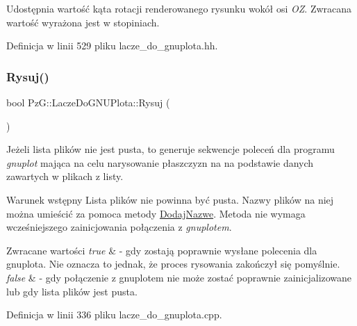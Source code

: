 Udostępnia wartość kąta rotacji renderowanego rysunku wokół osi {\itshape OZ}. Zwracana wartość wyrażona jest w stopiniach. 

Definicja w linii 529 pliku lacze\+\_\+do\+\_\+gnuplota.\+hh.

\mbox{\label{class_pz_g_1_1_lacze_do_g_n_u_plota_a065f5b8402737cc62b0ad4f66d028335}} 
\subsubsection{\texorpdfstring{Rysuj()}{Rysuj()}}
{\footnotesize\ttfamily bool Pz\+G\+::\+Lacze\+Do\+G\+N\+U\+Plota\+::\+Rysuj (\begin{DoxyParamCaption}{ }\end{DoxyParamCaption})}

Jeżeli lista plików nie jest pusta, to generuje sekwencje poleceń dla programu {\itshape gnuplot} mająca na celu narysowanie płaszczyzn na na podstawie danych zawartych w plikach z listy.

\begin{DoxyPrecond}{Warunek wstępny}
Lista plików nie powinna być pusta. Nazwy plików na niej można umieścić za pomoca metody \mbox{\hyperlink{}{Dodaj\+Nazwe}}. Metoda nie wymaga wcześniejszego zainicjowania połączenia z {\itshape gnuplotem}. 
\end{DoxyPrecond}

\begin{DoxyRetVals}{Zwracane wartości}
{\em true} & -\/ gdy zostają poprawnie wysłane polecenia dla gnuplota. Nie oznacza to jednak, że proces rysowania zakończył się pomyślnie. \\
\hline
{\em false} & -\/ gdy połączenie z gnuplotem nie może zostać poprawnie zainicjalizowane lub gdy lista plików jest pusta. \\
\hline
\end{DoxyRetVals}


Definicja w linii 336 pliku lacze\+\_\+do\+\_\+gnuplota.\+cpp.

